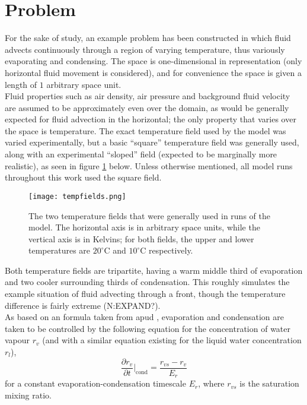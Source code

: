 \documentclass[11pt]{article}
\begin{document}
\section{Problem}
For the sake of study, an example problem has been constructed in which fluid advects continuously through a region of varying temperature, thus variously evaporating and condensing. The space is one-dimensional in representation (only horizontal fluid movement is considered), and for convenience the space is given a length of $1$ arbitrary space unit. \\
Fluid properties such as air density, air pressure and background fluid velocity are assumed to be approximately even over the domain, as would be generally expected for fluid advection in the horizontal; the only property that varies over the space is temperature. The exact temperature field used by the model was varied experimentally, but a basic ``square'' temperature field was generally used, along with an experimental ``sloped'' field (expected to be marginally more realistic), as seen in figure \ref{fig:tempfields} below. Unless otherwise mentioned, all model runs throughout this work used the square field.
\begin{figure}[H]
\centering
\texttt{[image: tempfields.png]}
\caption{The two temperature fields that were generally used in runs of the model. The horizontal axis is in arbitrary space units, while the vertical axis is in Kelvins; for both fields, the upper and lower temperatures are $20^{\circ}$C and $10^{\circ}$C respectively.}
\label{fig:tempfields}
\end{figure}
Both temperature fields are tripartite, having a warm middle third of evaporation and two cooler surrounding thirds of condensation. This roughly simulates the example situation of fluid advecting through a front, though the temperature difference is fairly extreme (N:EXPAND?). \\
As based on an formula taken from \citet[p.~2920]{BF2002} apud \citet{RH1983}, evaporation and condensation are taken to be controlled by the following equation for the concentration of water vapour $r_v$ (and with a similar equation existing for the liquid water concentration $r_l$),
\begin{equation} \label{eq:1}
\frac{\partial r_v}{\partial t}|_{\text{cond}}=\frac{r_{vs} - r_v}{E_r}
\end{equation}
for a constant evaporation-condensation timescale $E_r$, where $r_{vs}$ is the saturation mixing ratio. \\
\end{document}
